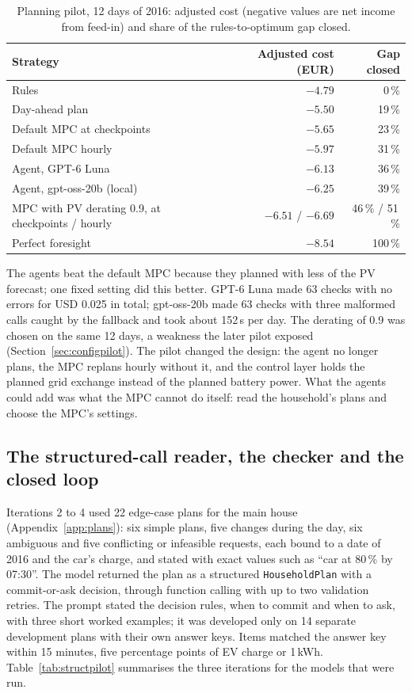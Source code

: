 \documentclass[12pt,a4paper]{report}
\begin{document}
\begin{table}[htbp]
\caption{Planning pilot, 12 days of 2016: adjusted cost (negative values
are net income from feed-in) and share of the rules-to-optimum gap
closed.}
\label{tab:gatewaypilot}
\small
\begin{tabularx}{\textwidth}{@{}Xrr@{}}
\toprule
Strategy & Adjusted cost (EUR) & Gap closed \\
\midrule
Rules & $-4.79$ & 0\,\% \\
Day-ahead plan & $-5.50$ & 19\,\% \\
Default MPC at checkpoints & $-5.65$ & 23\,\% \\
Default MPC hourly & $-5.97$ & 31\,\% \\
Agent, GPT-6 Luna & $-6.13$ & 36\,\% \\
Agent, gpt-oss-20b (local) & $-6.25$ & 39\,\% \\
MPC with PV derating 0.9, at checkpoints / hourly & $-6.51$ / $-6.69$ & 46\,\% / 51\,\% \\
Perfect foresight & $-8.54$ & 100\,\% \\
\bottomrule
\end{tabularx}
\end{table}

The agents beat the default MPC because they planned with less of the
PV forecast; one fixed setting did this better. GPT-6 Luna made 63
checks with no errors for USD 0.025 in total; gpt-oss-20b made 63
checks with three malformed calls caught by the fallback and took about
152\,s per day. The derating of 0.9 was chosen on the same 12 days, a
weakness the later pilot exposed (Section~\ref{sec:configpilot}). The
pilot changed the design: the agent no longer plans, the MPC replans
hourly without it, and the control layer holds the planned grid exchange
instead of the planned battery power. What the agents could add was
what the MPC cannot do itself: read the household's plans and choose
the MPC's settings.

\subsection{The structured-call reader, the checker and the closed loop}
\label{sec:planpilot}
\label{sec:looppilot}

Iterations 2 to 4 used 22 edge-case plans for the main house
(Appendix~\ref{app:plans}): six simple plans, five changes during the
day, six ambiguous and five conflicting or infeasible requests, each
bound to a date of 2016 and the car's charge, and stated with exact
values such as ``car at 80\,\% by 07:30''. The model returned the plan
as a structured \texttt{HouseholdPlan} with a commit-or-ask decision,
through function calling with up to two validation retries. The prompt
stated the decision rules, when to commit and when to ask, with three
short worked examples; it was developed only on 14 separate development
plans with their own answer keys. Items
matched the answer key within 15 minutes, five percentage points of EV
charge or 1\,kWh. Table~\ref{tab:structpilot} summarises the three
iterations for the models that were run.
\end{document}
